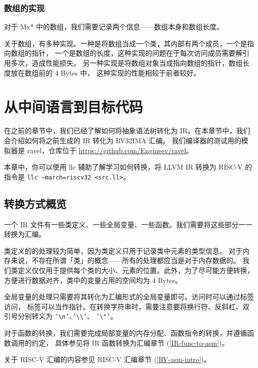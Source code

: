 \subsubsection{数组的实现}\label{AST-to-IR-for-builtin-array}

对于 Mx* 中的数组，我们需要记录两个信息——数组本身和数组长度。

关于数组，有多种实现。一种是将数组当成一个类，其内部有两个成员，一个是指向数组的指针，
一个是数组的长度，这种实现的问题在于每次访问成员需要解引用多次，造成性能损失。
另一种实现是将数组对象当成指向数组的指针，数组长度放在数组前的 4 Bytes 中，
这种实现的性能相较于前者较好。

\section{从中间语言到目标代码}

在之前的章节中，我们已经了解如何将抽象语法树转化为
IR。在本章节中，我们会介绍如何将之前生成的 IR 转化为 RV32IMA 汇编。
我们编译器的测试用的模拟器是 ravel，仓库位于 \url{https://github.com/Engineev/ravel}。

\begin{remark}
本章中，你可以使用 llc 辅助了解学习如何转换，将 LLVM IR 转换为 RISC-V 的指令是
\texttt{llc --march=riscv32 <src.ll>}。
\end{remark}

\subsection{转换方式概览}

一个 IR 文件有一些类定义、一些全局变量、一些函数。我们需要将这些部分一一转换为汇编。

类定义的的处理较为简单，因为类定义只用于记录类中元素的类型信息。
对于内存来说，不存在所谓「类」的概念——所有的处理都应当是对于内存数据的。
我们类定义仅仅用于提供每个类的大小、元素的位置。此外，为了尽可能方便转换，
方便进行数据对齐，类中的变量占用的空间均为 4 Bytes。

全局变量的处理只需要将其转化为汇编形式的全局变量即可。访问时可以通过标签访问，
标签可以当作指针。在转换字符串时，需要注意要将换行符、反斜杠、双引号分别转义为
\texttt{'\textbackslash{}n'}、\texttt{'\textbackslash\textbackslash'}、
\texttt{'\textbackslash"'}。

对于函数的转换，我们需要完成局部变量的内存分配、函数指令的转换，并遵循函数调用的约定，
具体参见将 IR 函数转换为汇编章节 (\ref{IR-func-to-asm})。

关于 RISC-V 汇编的内容参见 RISC-V 汇编章节 (\ref{RV-asm-intro})。

